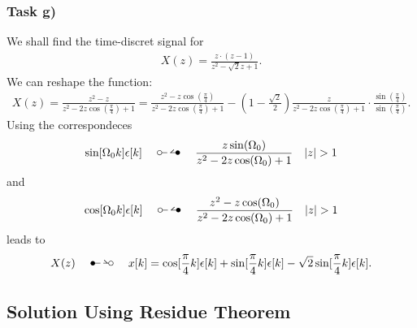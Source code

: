 \subsubsection{Task g)}
We shall find the time-discret signal for
\begin{align}
	X(z)=\frac{z\cdot(z-1)}{z^2-\sqrt{2}z+1}.
\end{align}
We can reshape the function:
\begin{align}
	X(z)=\frac{z^2-z}{z^2-2z\cos(\frac{\pi}{4})+1}=\frac{z^2-z\cos(\frac{\pi}{4})}{z^2-2z\cos(\frac{\pi}{4})+1}-(1-\frac{\sqrt{2}}{2})\frac{z}{z^2-2z\cos(\frac{\pi}{4})+1}\cdot\frac{\sin(\frac{\pi}{4})}{\sin(\frac{\pi}{4})}.
\end{align}
Using the correspondeces
\begin{align}
	\sin[\Omega_0k]\epsilon[k]\quad\ztransf\quad\frac{z\sin(\Omega_0)}{z^2-2z\cos(\Omega_0)+1}\quad |z| > 1
\end{align}
and
\begin{align}
	\cos[\Omega_0k]\epsilon[k]\quad\ztransf\quad\frac{z^2-z\cos(\Omega_0)}{z^2-2z\cos(\Omega_0)+1}\quad |z| > 1
\end{align}
leads to
\begin{align}
	X(z)\quad\Ztransf\quad x[k]=\cos[\frac{\pi}{4}k]\epsilon[k]+\sin[\frac{\pi}{4}k]\epsilon[k]-\sqrt{2}\sin[\frac{\pi}{4}k]\epsilon[k].
\end{align}
\subsection{Solution Using Residue Theorem}
